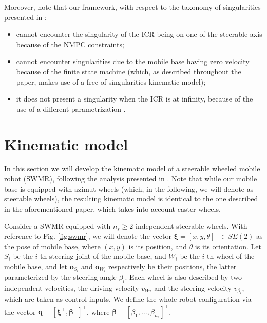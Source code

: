 Moreover, note that our framework, with respect to the taxonomy of singularities
presented in \cite{Sorour2017RAL}:
\begin{itemize}
    \item cannot encounter the singularity of the ICR being on one of the
        steerable axis because of the NMPC constraints;
    \item cannot encounter singularities due to the mobile base having zero
        velocity because of the finite state machine (which, as described
        throughout the paper, makes use of a free-of-singularities kinematic
        model);
    \item it does not present a singularity when the ICR is at infinity,
        because of the use of a different parametrization
        \cite{RobuffoGiordano2009ICRA}.
\end{itemize}  

\section{Kinematic model}
\label{sec:kinematic-model}
In this section we will develop the kinematic model of a steerable wheeled mobile robot (SWMR), following the analysis presented in \cite{RobuffoGiordano2009ICRA}. Note that while our mobile base is equipped with azimut wheels (which, in the following, we will denote as steerable wheels), the resulting kinematic model is identical to the one described in the aforementioned paper, which takes into account caster wheels.

Consider a SWMR equipped with $n_s \ge 2$ independent steerable wheels. With reference to Fig. \ref{fig:swmr}, we will denote the vector $\bm{\xi} = [x, y, \theta]^\top \in SE(2)$ as the pose of mobile base, where $(x, y)$ is its position, and $\theta$ is its orientation. Let $S_i$ be the $i$-th steering joint of the mobile base, and $W_i$ be the $i$-th wheel of the mobile base, and let $\bm{o}_{S_i}$ and $\bm{o}_{W_i}$ respectively be their positions, the latter parameterized by the steering angle $\beta_i$. Each wheel is also described by two independent velocities, the driving velocity $v_{Wi}$ and the steering velocity $v_{\beta_i}$, which are taken as control inputs. We define the whole robot configuration via the vector $\bm{q}=[\bm{\xi}^\top, \bm{\beta}^\top]^\top$, where $\bm{\beta}=[\beta_1, \dots, \beta_{n_s}]^\top$.

